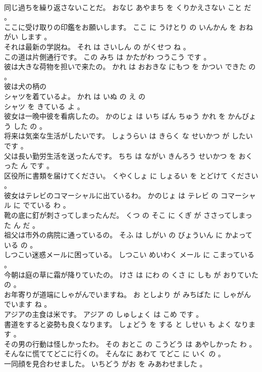 \documentclass[8pt]{extreport}
\begin{document}
\begin{CJK}{UTF8}{min}
\\	同じ過ちを繰り返さないことだ。	おなじ あやまち を くりかえさない こと だ 。 
\\	ここに受け取りの印鑑をお願いします。	ここ に うけとり の いんかん を おねがい します 。 
\\	それは最新の学説ね。	それ は さいしん の がくせつ ね 。 
\\	この道は片側通行です。	この みち は かたがわ つうこう です 。 
\\	彼は大きな荷物を担いで来たの。	かれ は おおきな にもつ を かつい できた の 。 
\\	彼は犬の柄の
\\	シャツを着ているよ。	かれ は いぬ の え の 
\\	シャツ を きている よ 。 
\\	彼女は一晩中彼を看病したの。	かのじょ は いち ばん ちゅう かれ を かんびょう した の 。 
\\	将来は気楽な生活がしたいです。	しょうらい は きらく な せいかつ が したい です 。 
\\	父は長い勤労生活を送ったんです。	ちち は ながい きんろう せいかつ を おくった ん です 。 
\\	区役所に書類を届けてください。	くやくしょ に しょるい を とどけて ください 。 
\\	彼女はテレビのコマーシャルに出ているわ。	かのじょ は テレビ の コマーシャル に でている わ 。 
\\	靴の底に釘が刺さってしまったんだ。	くつ の そこ に くぎ が ささってしまった ん だ 。 
\\	祖父は市外の病院に通っているの。	そふ は しがい の びょういん に かよっている の 。 
\\	しつこい迷惑メールに困っている。	しつこい めいわく メール に こまっている 。 
\\	今朝は庭の草に霜が降りていたの。	けさ は にわ の くさ に しも が おりていた の 。 
\\	お年寄りが道端にしゃがんでいますね。	お としより が みちばた に しゃがん でいます ね 。 
\\	アジアの主食は米です。	アジア の しゅしょく は こめ です 。 
\\	書道をすると姿勢も良くなります。	しょどう を する と しせい も よく なります 。 
\\	その男の行動は怪しかったわ。	その おとこ の こうどう は あやしかった わ 。 
\\	そんなに慌ててどこに行くの。	そんなに あわて てどこ に いく の 。 
\\	一同顔を見合わせました。	いちどう がお を みあわせました 。 

\end{CJK}
\end{document}
